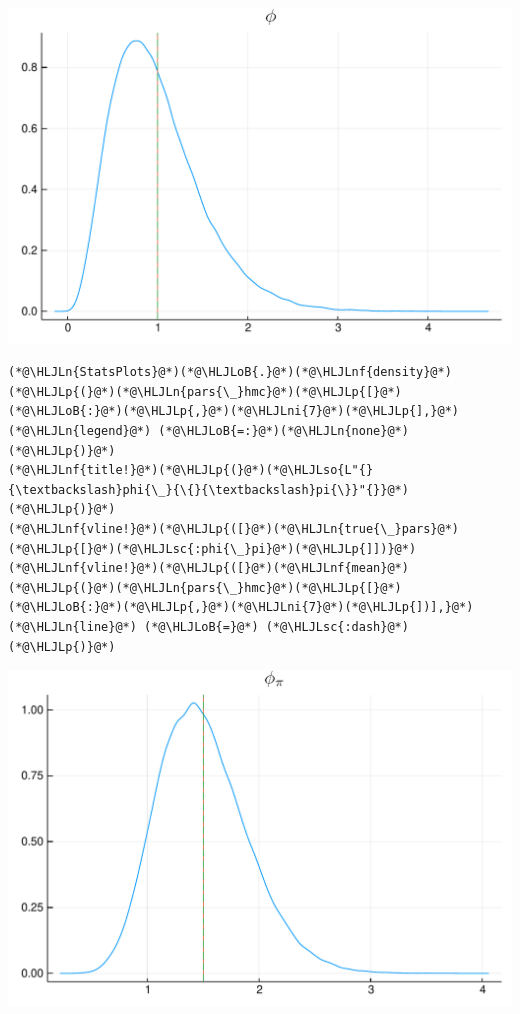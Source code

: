 \documentclass[12pt,a4paper]{article}
\newcommand{\HLJLn}[1]{#1}
\newcommand{\HLJLnf}[1]{\textcolor[RGB]{66,102,213}{#1}}
\newcommand{\HLJLsc}[1]{\textcolor[RGB]{201,61,57}{#1}}
\newcommand{\HLJLso}[1]{\textcolor[RGB]{201,61,57}{#1}}
\newcommand{\HLJLni}[1]{\textcolor[RGB]{59,151,46}{#1}}
\newcommand{\HLJLoB}[1]{\textcolor[RGB]{102,102,102}{\textbf{#1}}}
\newcommand{\HLJLp}[1]{#1}
\begin{document}
\includegraphics[width=\linewidth]{figures/dsge_and_julia_40_1.pdf}

\begin{lstlisting}
(*@\HLJLn{StatsPlots}@*)(*@\HLJLoB{.}@*)(*@\HLJLnf{density}@*)(*@\HLJLp{(}@*)(*@\HLJLn{pars{\_}hmc}@*)(*@\HLJLp{[}@*)(*@\HLJLoB{:}@*)(*@\HLJLp{,}@*)(*@\HLJLni{7}@*)(*@\HLJLp{],}@*) (*@\HLJLn{legend}@*) (*@\HLJLoB{=:}@*)(*@\HLJLn{none}@*)(*@\HLJLp{)}@*)
(*@\HLJLnf{title!}@*)(*@\HLJLp{(}@*)(*@\HLJLso{L"{}{\textbackslash}phi{\_}{\{}{\textbackslash}pi{\}}"{}}@*)(*@\HLJLp{)}@*)
(*@\HLJLnf{vline!}@*)(*@\HLJLp{([}@*)(*@\HLJLn{true{\_}pars}@*)(*@\HLJLp{[}@*)(*@\HLJLsc{:phi{\_}pi}@*)(*@\HLJLp{]])}@*)
(*@\HLJLnf{vline!}@*)(*@\HLJLp{([}@*)(*@\HLJLnf{mean}@*)(*@\HLJLp{(}@*)(*@\HLJLn{pars{\_}hmc}@*)(*@\HLJLp{[}@*)(*@\HLJLoB{:}@*)(*@\HLJLp{,}@*)(*@\HLJLni{7}@*)(*@\HLJLp{])],}@*) (*@\HLJLn{line}@*) (*@\HLJLoB{=}@*) (*@\HLJLsc{:dash}@*)(*@\HLJLp{)}@*)
\end{lstlisting}

\includegraphics[width=\linewidth]{figures/dsge_and_julia_41_1.pdf}
\end{document}
